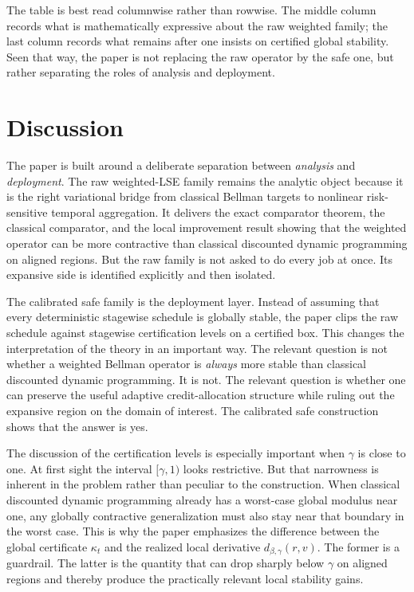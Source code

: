 \documentclass{article}
\theoremstyle{remark}
\begin{document}
The table is best read columnwise rather than rowwise.
The middle column records what is mathematically expressive about the raw weighted family; the last column records what remains after one insists on certified global stability.
Seen that way, the paper is not replacing the raw operator by the safe one, but rather separating the roles of analysis and deployment.

\section{Discussion}
\label{sec:discussion}

The paper is built around a deliberate separation between \emph{analysis} and \emph{deployment}.
The raw weighted-LSE family remains the analytic object because it is the right variational bridge from classical Bellman targets to nonlinear risk-sensitive temporal aggregation.
It delivers the exact comparator theorem, the classical comparator, and the local improvement result showing that the weighted operator can be more contractive than classical discounted dynamic programming on aligned regions.
But the raw family is not asked to do every job at once.
Its expansive side is identified explicitly and then isolated.

The calibrated safe family is the deployment layer.
Instead of assuming that every deterministic stagewise schedule is globally stable, the paper clips the raw schedule against stagewise certification levels on a certified box.
This changes the interpretation of the theory in an important way.
The relevant question is not whether a weighted Bellman operator is \emph{always} more stable than classical discounted dynamic programming.
It is not.
The relevant question is whether one can preserve the useful adaptive credit-allocation structure while ruling out the expansive region on the domain of interest.
The calibrated safe construction shows that the answer is yes.

The discussion of the certification levels is especially important when $\gamma$ is close to one.
At first sight the interval $[\gamma,1)$ looks restrictive.
But that narrowness is inherent in the problem rather than peculiar to the construction.
When classical discounted dynamic programming already has a worst-case global modulus near one, any globally contractive generalization must also stay near that boundary in the worst case.
This is why the paper emphasizes the difference between the global certificate $\kappa_t$ and the realized local derivative $d_{\beta,\gamma}(r,v)$.
The former is a guardrail.
The latter is the quantity that can drop sharply below $\gamma$ on aligned regions and thereby produce the practically relevant local stability gains.
\end{document}
